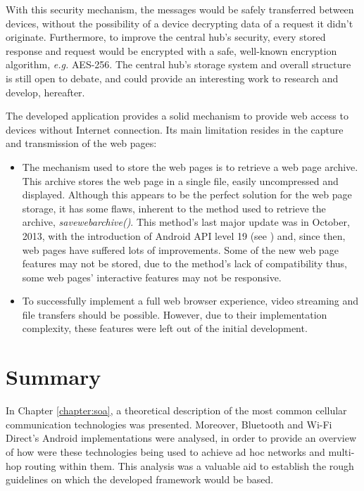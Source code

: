 \begin{itemize}
	With this security mechanism, the messages would be safely transferred between devices, without the possibility of a device decrypting data of a request it didn't originate. Furthermore, to improve the central hub's security, every stored response and request would be encrypted with a safe, well-known encryption algorithm, \textit{e.g.} \gls{AES}-256. The central hub's storage system and overall structure is still open to debate, and could provide an interesting work to research and develop, hereafter.
	
\end{itemize}

The developed application provides a solid mechanism to provide web access to devices without Internet connection. Its main limitation resides in the capture and transmission of the web pages:

\begin{itemize}
	
	\item The mechanism used to store the web pages is to retrieve a web page archive. This archive stores the web page in a single file, easily uncompressed and displayed. Although this appears to be the perfect solution for the web page storage, it has some flaws, inherent to the method used to retrieve the archive, \textit{savewebarchive()}. This method's last major update was in October, 2013, with the introduction of Android API level 19 (see \cite{kitkat}) and, since then, web pages have suffered lots of improvements. Some of the new web page features may not be stored, due to the method's lack of compatibility thus, some web pages' interactive features may not be responsive.
	
	\item To successfully implement a full web browser experience, video streaming and file transfers should be possible. However, due to their implementation complexity, these features were left out of the initial development.
	
\end{itemize}


\section{Summary}

In Chapter \ref{chapter:soa}, a theoretical description of the most common cellular communication technologies was presented. Moreover, Bluetooth and Wi-Fi Direct's Android implementations were analysed, in order to provide an overview of how were these technologies being used to achieve ad hoc networks and multi-hop routing within them. This analysis was a valuable aid to establish the rough guidelines on which the developed framework would be based.

